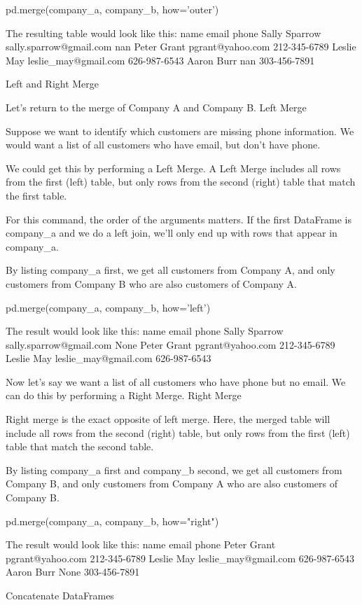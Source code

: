 \documentclass{journal}
\begin{document}
pd.merge(company_a, company_b, how='outer')

The resulting table would look like this:
name 	email 	phone
Sally Sparrow 	sally.sparrow@gmail.com 	nan
Peter Grant 	pgrant@yahoo.com 	212-345-6789
Leslie May 	leslie_may@gmail.com 	626-987-6543
Aaron Burr 	nan 	303-456-7891


Left and Right Merge

Let’s return to the merge of Company A and Company B.
Left Merge

Suppose we want to identify which customers are missing phone information. We would want a list of all customers who have email, but don’t have phone.

We could get this by performing a Left Merge. A Left Merge includes all rows from the first (left) table, but only rows from the second (right) table that match the first table.

For this command, the order of the arguments matters. If the first DataFrame is company_a and we do a left join, we’ll only end up with rows that appear in company_a.

By listing company_a first, we get all customers from Company A, and only customers from Company B who are also customers of Company A.

pd.merge(company_a, company_b, how='left')

The result would look like this:
name 	email 	phone
Sally Sparrow 	sally.sparrow@gmail.com 	None
Peter Grant 	pgrant@yahoo.com 	212-345-6789
Leslie May 	leslie_may@gmail.com 	626-987-6543

Now let’s say we want a list of all customers who have phone but no email. We can do this by performing a Right Merge.
Right Merge

Right merge is the exact opposite of left merge. Here, the merged table will include all rows from the second (right) table, but only rows from the first (left) table that match the second table.

By listing company_a first and company_b second, we get all customers from Company B, and only customers from Company A who are also customers of Company B.

pd.merge(company_a, company_b, how="right")

The result would look like this:
name 	email 	phone
Peter Grant 	pgrant@yahoo.com 	212-345-6789
Leslie May 	leslie_may@gmail.com 	626-987-6543
Aaron Burr 	None 	303-456-7891


Concatenate DataFrames
\end{document}
